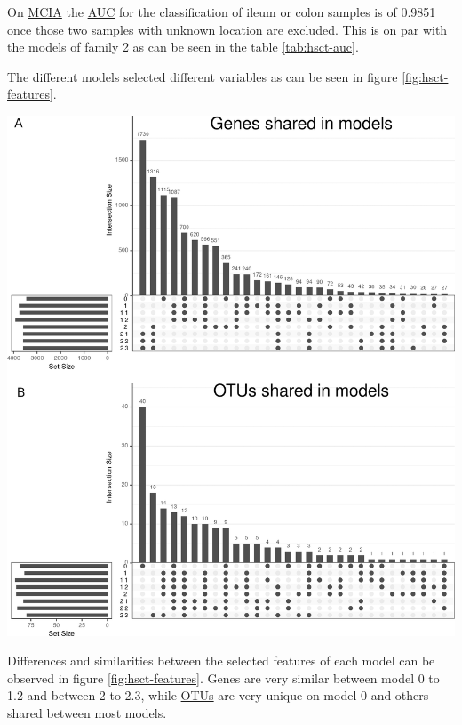 \documentclass[
  12pt,
  a4paper,
  twoside,
  openright]{book}
\let\origfigure\figure
\let\endorigfigure\endfigure
\renewenvironment{figure}[1][2] {
    \expandafter\origfigure\expandafter[!htbp]
} {
    \endorigfigure
}
\begin{document}
On \protect\hyperlink{acronyms_MCIA}{MCIA} the \protect\hyperlink{acronyms_AUC}{AUC} for the classification of ileum or colon samples is of 0.9851 once those two samples with unknown location are excluded.
This is on par with the models of family 2 as can be seen in the table \ref{tab:hsct-auc}.

The different models selected different variables as can be seen in figure \ref{fig:hsct-features}.

\begin{figure}
\includegraphics[width=1\linewidth]{images/hsct-features} \caption[Upset plot of variables selected in the HSCT dataset.]{Upset plot of variables selected in the HSCT dataset. The variables selected on each model from 0 to 2.3 showing the intersection between them regarding genes, panel A, and OTUs, panel B. Genes are common on models of family 2, while OTUs are common on all models.}\label{fig:hsct-features}
\end{figure}

Differences and similarities between the selected features of each model can be observed in figure \ref{fig:hsct-features}.
Genes are very similar between model 0 to 1.2 and between 2 to 2.3, while \protect\hyperlink{acronyms_OTUs}{OTUs} are very unique on model 0 and others shared between most models.
\end{document}
